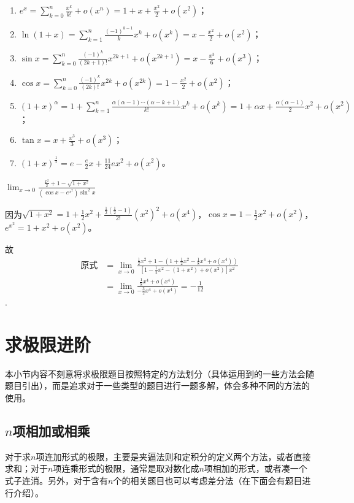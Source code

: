 \begin{enumerate}
	\item $e^x=\sum_{k=0}^{n}\frac{x^k}{k!} +o(x^n)=1+x+\frac{x^2}{2}+o(x^2)$；
	\item $\ln(1+x)=\sum_{k=1}^{n}\frac{(-1)^{k-1}}{k}x^k +o(x^k)=x-\frac{x^2}{2}+o(x^2)$；
	\item $\sin x=\sum_{k=0}^{n}\frac{(-1)^k}{(2k+1)!}x^{2k+1} +o(x^{2k+1})=x-\frac{x^3}{6}+o(x^3)$；
	\item $\cos x=\sum_{k=0}^{n}\frac{(-1)^k}{(2k)!}x^{2k} +o(x^{2k})=1-\frac{x^2}{2}+o(x^2)$；
	\item $(1+x)^\alpha =1+\sum_{k=1}^{n}\frac{\alpha (\alpha-1) \cdots (\alpha-k+1)}{k!}x^k +o(x^k)=1+\alpha x+\frac{\alpha(\alpha-1)}{2}x^2+o(x^2)$；
	\item $\tan x=x+\frac{x^3}{3}+o(x^3)$；
	\item $(1+x)^{\frac{1}{x}}=e-\frac{e}{2}x+\frac{11}{24}ex^2+o(x^2)$。
\end{enumerate}

\begin{example}
	$\lim_{x \to 0}\frac{\frac{x^2}{2}+1-\sqrt{1+x^2}}{(\cos x -e^{x^2})\sin^2 x}$
	\begin{solution}
		因为$\sqrt{1+x^2}=1+\frac{1}{2}x^2+\frac{\frac{1}{2}(\frac{1}{2}-1)}{2!}(x^2)^2+o(x^4)$，$\cos x=1-\frac{1}{2}x^2+o(x^2)$，$e^{x^2}=1+x^2+o(x^2)$。

		故\begin{align*}
			\text{原式} & = \lim_{x\to 0}\frac{\frac{1}{2}x^2+1-(1+\frac{1}{2}x^2-\frac{1}{8}x^4+o(x^4))}{[1-\frac{1}{2}x^2-(1+x^2)+o(x^2)]x^2} \\
			            & =\lim_{x \to 0}\frac{\frac{1}{8}x^4+o(x^4)}{-\frac{3}{2}x^4+o(x^4)}=-\frac{1}{12}
		\end{align*}
		.
	\end{solution}
\end{example}

\section{求极限进阶}
本小节内容不刻意将求极限题目按照特定的方法划分（具体运用到的一些方法会随题目引出），而是追求对于一些类型的题目进行一题多解，体会多种不同的方法的使用。
\subsection{$n$项相加或相乘}
对于求$n$项连加形式的极限，主要是夹逼法则和定积分的定义两个方法，或者直接求和；对于$n$项连乘形式的极限，通常是取对数化成$n$项相加的形式，或者凑一个式子连消。另外，对于含有$n$个的相关题目也可以考虑差分法（在下面会有题目进行介绍）。

